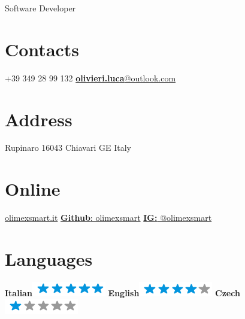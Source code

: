 \documentclass[]{friggeri-cv}
\begin{document}
      {Software Developer}
      

\begin{aside}
  \section{Contacts}    
	+39 349 28 99 132
	\href{mailto:gliolivieri@live.it}{\textbf{olivieri.luca}@outlook.com}
	~	
  \section{Address}
  	Rupinaro
    16043 Chiavari GE
    Italy
    ~
  \section{Online}
    \href{http://www.olimexsmart.it}{olimexsmart.it}    
    \href{https://github.com/olimexsmart}{\textbf{Github}: olimexsmart}
    \href{https://www.instagram.com/olimexsmart/}{\textbf{IG: }@olimexsmart}
    ~
  \section{Languages}
    \textbf{Italian}\includegraphics[scale=0.40]{img/5stars.png}
    \textbf{English}\includegraphics[scale=0.40]{img/4stars.png}
    \textbf{Czech}\includegraphics[scale=0.40]{img/1stars.png}    
\end{aside}
\end{document}
